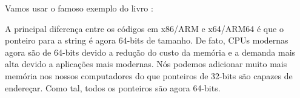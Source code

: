 \chapterold{\HelloWorldSectionName}
\label{sec:helloworld}

Vamos usar o famoso exemplo do livro \KRBook:














\sectionold{\Conclusion{}}

A principal diferença entre os códigos em x86/ARM e x64/ARM64 é que o ponteiro para a string é agora 64-bits de tamanho.
De fato, \ac{CPU}s modernas agora são de 64-bits devido a redução do custo da memória e a demanda mais alta devido a aplicações mais modernas.
Nós podemos adicionar muito mais memória nos nossos computadores do que ponteiros de 32-bits são capazes de endereçar.
Como tal, todos os ponteiros são agora 64-bits.



